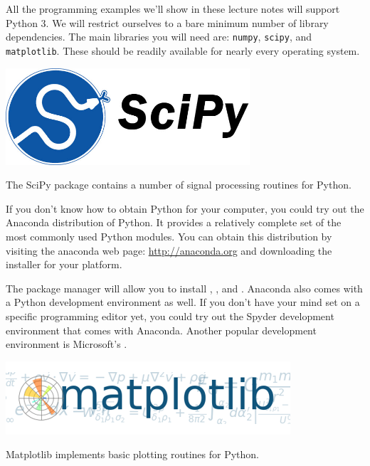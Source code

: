 All the programming examples we'll show in these lecture notes will
support Python 3. We will restrict ourselves to a bare minimum number
of library dependencies. The main libraries you will need are:
\verb|numpy|, \verb|scipy|, and \verb|matplotlib|. These should be
readily available for nearly every operating system.

\begin{marginfigure}
  \begin{center}
    \includegraphics[width=0.68\textwidth]{ch02/figures/scipy.jpg}
  \end{center}
  \caption{The SciPy package contains a number of signal processing routines for Python.}
\end{marginfigure}

If you don't know how to obtain Python for your computer, you could
try out the Anaconda distribution of Python. It provides a relatively
complete set of the most commonly used Python modules. You can obtain
this distribution by visiting the anaconda web page:
\url{http://anaconda.org} and downloading the installer for your
platform.

The  package manager will allow you to install , ,
and . Anaconda also comes with a Python development
environment as well. If you don't have your mind set on a specific
programming editor yet, you could try out the Spyder development
environment that comes with Anaconda. Another popular development environment is Microsoft's .

\begin{marginfigure}
  \includegraphics[width=\textwidth]{ch02/figures/matplotlib.png}
  \caption{Matplotlib implements basic plotting routines for Python.}
\end{marginfigure}


